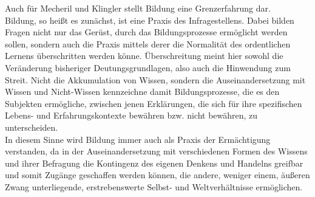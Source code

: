 Auch für Mecheril und Klingler stellt Bildung eine
Grenzerfahrung dar.\\
Bildung, so heißt es zunächst, ist eine Praxis des
Infragestellens.  \footnotemark {} Dabei bilden Fragen nicht nur das Gerüst, durch das
Bildungsprozesse ermöglicht werden sollen, sondern auch die Praxis mittels
derer \glqq die Normalität des ordentlichen Lernens\grqq\footnotemark
{} überschritten werden könne.
Überschreitung meint hier sowohl die Veränderung bisheriger Deutungsgrundlagen,
also auch die Hinwendung zum Streit.\footnotemark {} Nicht die Akkumulation von Wissen,
sondern die Auseinandersetzung mit Wissen und Nicht-Wissen kennzeichne damit
Bildungsprozesse, die es den Subjekten ermögliche, zwischen jenen Erklärungen,
die sich für ihre spezifischen Lebens- und Erfahrungskontexte bewähren bzw.
nicht bewähren, zu unterscheiden. \footnotemark {}\\ 

\noindent In diesem Sinne wird Bildung immer auch als
Praxis der Ermächtigung verstanden, da in der Auseinandersetzung mit
verschiedenen Formen des Wissens und ihrer Befragung die Kontingenz des eigenen
Denkens und Handelns greifbar und somit Zugänge geschaffen werden können, die
\glqq andere, weniger einem, äußeren Zwang unterliegende, erstrebenswerte Selbst-
und Weltverhältnisse\grqq\footnotemark {}  ermöglichen.\\

